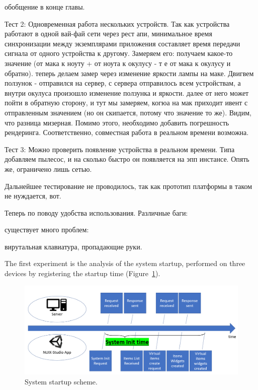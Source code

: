 обобщение в конце главы.

Тест 2: Одновременная работа нескольких устройств. Так как устройства работают в одной вай-фай сети через рест апи, минимальное время синхронизации между экземплярами приложения составляет время передачи сигнала от одного устройства к другому. Замеряем его: получаем какое-то значение (от мака к ноуту + от ноута к окулусу - т е от мака к окулусу и обратно). теперь делаем замер через изменение яркости лампы на маке. Двигвем ползунок - отправился на сервер, с сервера отправилось всем устройствам, а внутри окулуса произошло изменение ползунка и яркости. далее от него может пойти в обратную сторону, и тут мы замеряем, когюа на мак приходит ивент с отправленным значением (но он скипается, потому что значение то же). Видим, что разница мизерная. Помимо этого, необходимо добавить погрешность рендеринга. Соответственно, совместная работа в реальном времени возможна.

Тест 3: Можно проверить появление устройства в реальном времени. Типа добавляем пылесос, и на сколько быстро он появляется на эпп инстансе. Опять же, ограничено лишь сетью.

Дальнейшее тестирование не проводилось, так как прототип платформы в таком не нуждается, вот.


Теперь по поводу удобства использования. Различные баги:

существует много проблем:

вирутальная клавиатура, пропадающие руки.




The first experiment is the analysis of the system startup, performed on three devices by registering the startup time (Figure~\ref{fig:SystemStartupScheme-figure}).

\begin{figure}
  \centering
  \includegraphics[width=0.9\linewidth]{figures/SystemStartupScheme.png}
  \caption{System startup scheme.}
  \label{fig:SystemStartupScheme-figure}
\end{figure}

